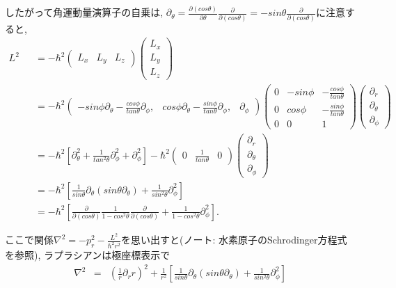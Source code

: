 \documentclass[11pt,a4paper]{jsarticle}
\begin{document}
したがって角運動量演算子の自乗は, $\partial_\theta= \frac{\partial( cos \theta)}{\partial \theta} \frac{\partial}{\partial( cos \theta)}= -sin\theta\frac{\partial}{\partial( cos \theta)}$に注意すると, 
\begin{eqnarray}
L^2 &&= -\hbar^2 \left(\begin{array}{ccc} L_x & L_y & L_z \end{array} \right) \left( \begin{array}{c} L_x \\ L_y \\ L_z \end{array} \right) \nonumber \nonumber \\
&&= -\hbar^2 \left(\begin{array}{ccc} -sin\phi\partial_\theta - \frac{cos\phi}{tan\theta } \partial_\phi, & cos\phi \partial_\theta - \frac{sin\phi}{tan\theta }\partial_\phi, & \partial_\phi \end{array} \right) \left(\begin{array}{ccc} 0 & -sin\phi &- \frac{cos\phi}{tan\theta } \\ 0 & cos\phi & - \frac{sin\phi}{tan\theta }\\ 0 & 0& 1 \end{array} \right) \left( \begin{array}{c} \partial_r \\ \partial_\theta \\ \partial_\phi \end{array} \right) \nonumber \\
&&= -\hbar^2 [ \partial_\theta^2 + \frac{1}{tan^2\theta } \partial_\phi^2 +  \partial_\phi^2 ]  -\hbar^2 \left(\begin{array}{ccc} 0 & \frac{1}{tan\theta } & 0 \end{array} \right) \left( \begin{array}{c} \partial_r \\ \partial_\theta \\ \partial_\phi \end{array} \right)\nonumber \\
&&= -\hbar^2 [  \frac{1}{sin\theta }\partial_\theta  ( sin\theta  \partial_\theta) + \frac{1}{sin^2\theta } \partial_\phi^2  ]\nonumber \\
&&= -\hbar^2 [ \frac{\partial}{\partial( cos \theta)}   \frac{1}{1- cos^2\theta } \frac{\partial}{\partial( cos \theta)}+ \frac{1}{1- cos^2\theta }\partial_\phi^2  ]. 
\end{eqnarray}

ここで関係$\nabla^2 = - p_r^2 - \frac{L^2}{\hbar^2 r^2}$を思い出すと(ノート: 水素原子のSchrodinger方程式を参照), ラプラシアンは極座標表示で
\begin{eqnarray}
\nabla^2 &= & (\frac{1}{r} \partial_r r)^2  + \frac{1}{r^2}[  \frac{1}{sin\theta }\partial_\theta  ( sin\theta  \partial_\theta) + \frac{1}{sin^2\theta } \partial_\phi^2  ]
\end{eqnarray}
\end{document}
